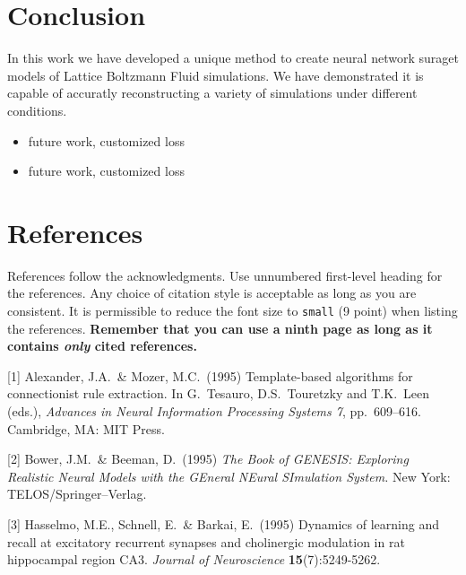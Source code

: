 \documentclass{article}
\begin{document}
\section{Conclusion}

In this work we have developed a unique method to create neural network suraget models of Lattice Boltzmann Fluid simulations. We have demonstrated it is capable of accuratly reconstructing a variety of simulations under different conditions.

\begin{itemize}
  \item future work, customized loss
  \item future work, customized loss
\end{itemize}

\section*{References}

References follow the acknowledgments. Use unnumbered first-level
heading for the references. Any choice of citation style is acceptable
as long as you are consistent. It is permissible to reduce the font
size to \verb+small+ (9 point) when listing the references. {\bf
  Remember that you can use a ninth page as long as it contains
  \emph{only} cited references.}
\medskip

\small

[1] Alexander, J.A.\ \& Mozer, M.C.\ (1995) Template-based algorithms
for connectionist rule extraction. In G.\ Tesauro, D.S.\ Touretzky and
T.K.\ Leen (eds.), {\it Advances in Neural Information Processing
  Systems 7}, pp.\ 609--616. Cambridge, MA: MIT Press.

[2] Bower, J.M.\ \& Beeman, D.\ (1995) {\it The Book of GENESIS:
  Exploring Realistic Neural Models with the GEneral NEural SImulation
  System.}  New York: TELOS/Springer--Verlag.

[3] Hasselmo, M.E., Schnell, E.\ \& Barkai, E.\ (1995) Dynamics of
learning and recall at excitatory recurrent synapses and cholinergic
modulation in rat hippocampal region CA3. {\it Journal of
  Neuroscience} {\bf 15}(7):5249-5262.
\end{document}
